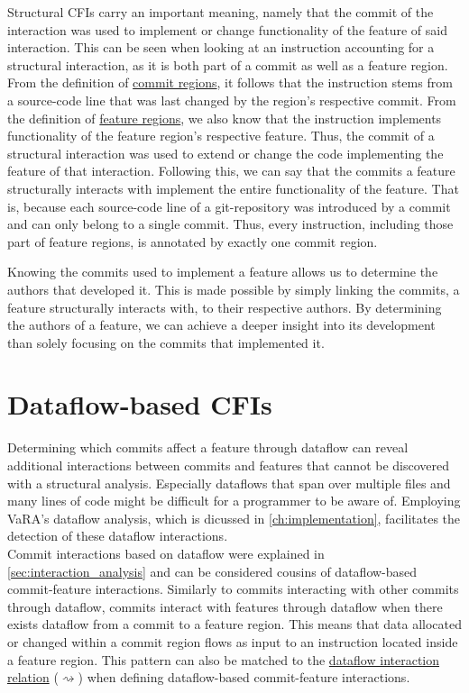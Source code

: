 Structural CFIs carry an important meaning, namely that the commit of the interaction was used to implement or change functionality of the feature of said interaction.
This can be seen when looking at an instruction accounting for a structural interaction, as it is both part of a commit as well as a feature region.
From the definition of \hyperref[def:commit_regions]{commit regions}, it follows that the instruction stems from a source-code line that was last changed by the region's respective commit. 
From the definition of \hyperref[def:feature_regions]{feature regions}, we also know that the instruction implements functionality of the feature region's respective feature. 
Thus, the commit of a structural interaction was used to extend or change the code implementing the feature of that interaction.
Following this, we can say that the commits a feature structurally interacts with implement the entire functionality of the feature.
That is, because each source-code line of a git-repository was introduced by a commit and can only belong to a single commit.
Thus, every instruction, including those part of feature regions, is annotated by exactly one commit region. 

Knowing the commits used to implement a feature allows us to determine the authors that developed it.
This is made possible by simply linking the commits, a feature structurally interacts with, to their respective authors.
By determining the authors of a feature, we can achieve a deeper insight into its development than solely focusing on the commits that implemented it. 

\section{Dataflow-based CFIs}\label{sec:dataflow_cfis}

Determining which commits affect a feature through dataflow can reveal additional interactions between commits and features that cannot be discovered with a structural analysis.
Especially dataflows that span over multiple files and many lines of code might be difficult for a programmer to be aware of.
Employing VaRA's dataflow analysis, which is dicussed in \autoref{ch:implementation}, facilitates the detection of these dataflow interactions. \\
Commit interactions based on dataflow were explained in \autoref{sec:interaction_analysis} and can be considered cousins of dataflow-based commit-feature interactions.
Similarly to commits interacting with other commits through dataflow, commits interact with features through dataflow when there exists dataflow from a commit to a feature region.
This means that data allocated or changed within a commit region flows as input to an instruction located inside a feature region.
This pattern can also be matched to the \hyperref[def:dataflow_relation]{dataflow interaction relation} ($\rightsquigarrow$) when defining dataflow-based commit-feature interactions.

